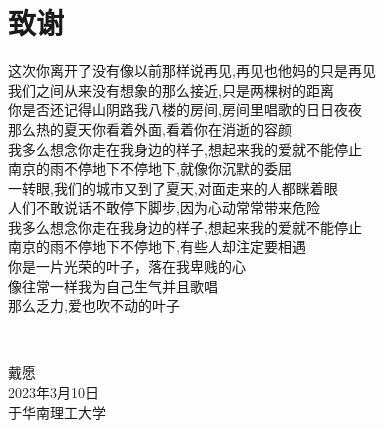 \chapter{致\texorpdfstring{\quad}{}谢}
\begin{center}
这次你离开了没有像以前那样说再见,再见也他妈的只是再见 
~\\
我们之间从来没有想象的那么接近,只是两棵树的距离 
~\\
你是否还记得山阴路我八楼的房间,房间里唱歌的日日夜夜 
~\\
那么热的夏天你看着外面,看着你在消逝的容颜 
~\\
我多么想念你走在我身边的样子,想起来我的爱就不能停止 
~\\
南京的雨不停地下不停地下,就像你沉默的委屈 
~\\
一转眼,我们的城市又到了夏天,对面走来的人都眯着眼 
~\\
人们不敢说话不敢停下脚步,因为心动常常带来危险 
~\\
我多么想念你走在我身边的样子,想起来我的爱就不能停止 
~\\
南京的雨不停地下不停地下,有些人却注定要相遇 
~\\
你是一片光荣的叶子，落在我卑贱的心 
~\\
像往常一样我为自己生气并且歌唱 
~\\
那么乏力,爱也吹不动的叶子 
\end{center}

~\\

\begin{minipage}[t]{0.945\textwidth}%
	\begin{flushright}
		戴愿\\
		2023年3月10日\\	%
		于华南理工大学
		\par\end{flushright}
\end{minipage}

